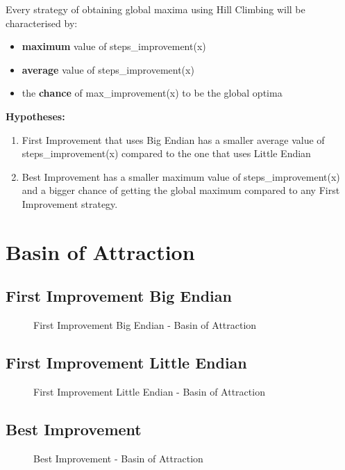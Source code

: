 \documentclass{article}
\begin{document}
Every strategy of obtaining global maxima using Hill Climbing will be characterised by:
\begin{itemize}
    \item \textbf{maximum} value of steps\_improvement(x)
    \item \textbf{average} value of steps\_improvement(x)
    \item the \textbf{chance} of max\_improvement(x) to be the global optima
\end{itemize}
\textbf{Hypotheses:}
\begin{enumerate}
    \item First Improvement that uses Big Endian has a smaller average value of steps\_improvement(x) compared to the one that uses Little Endian
    \item Best Improvement has a smaller maximum value of steps\_improvement(x) and a bigger chance of getting the global maximum compared to any First Improvement strategy.
\end{enumerate}


\newpage
\section{Basin of Attraction}
\subsection{First Improvement Big Endian}
\begin{figure}[H]
\end{figure}
\begin{figure}[H]
    \caption{First Improvement Big Endian - Basin of Attraction}
\end{figure}

\subsection{First Improvement Little Endian}
\begin{figure}[H]
\end{figure}
\begin{figure}[H]
    \caption{First Improvement Little Endian - Basin of Attraction}
\end{figure}

\subsection{Best Improvement}
\begin{figure}[H]
\end{figure}
\begin{figure}[H]
    \caption{Best Improvement - Basin of Attraction}
\end{figure}
\end{document}
